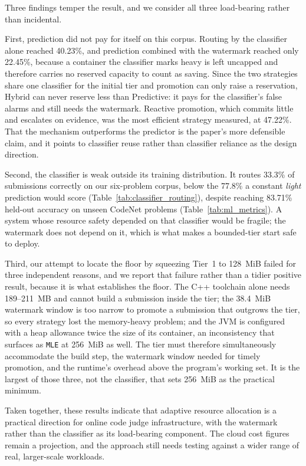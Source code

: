 \documentclass[conference]{IEEEtran}
\begin{document}
Three findings temper the result, and we consider all three load-bearing rather than incidental.

First, prediction did not pay for itself on this corpus. Routing by the classifier alone reached 40.23\%, and prediction combined with the watermark reached only 22.45\%, because a container the classifier marks heavy is left uncapped and therefore carries no reserved capacity to count as saving. Since the two strategies share one classifier for the initial tier and promotion can only raise a reservation, Hybrid can never reserve less than Predictive: it pays for the classifier's false alarms and still needs the watermark. Reactive promotion, which commits little and escalates on evidence, was the most efficient strategy measured, at 47.22\%. That the mechanism outperforms the predictor is the paper's more defensible claim, and it points to classifier reuse rather than classifier reliance as the design direction.

Second, the classifier is weak outside its training distribution. It routes 33.3\% of submissions correctly on our six-problem corpus, below the 77.8\% a constant \emph{light} prediction would score (Table~\ref{tab:classifier_routing}), despite reaching 83.71\% held-out accuracy on unseen CodeNet problems (Table~\ref{tab:ml_metrics}). A system whose resource safety depended on that classifier would be fragile; the watermark does not depend on it, which is what makes a bounded-tier start safe to deploy.

Third, our attempt to locate the floor by squeezing Tier~1 to 128~MiB failed for three independent reasons, and we report that failure rather than a tidier positive result, because it is what establishes the floor. The C++ toolchain alone needs 189--211~MB and cannot build a submission inside the tier; the 38.4~MiB watermark window is too narrow to promote a submission that outgrows the tier, so every strategy lost the memory-heavy problem; and the JVM is configured with a heap allowance twice the size of its container, an inconsistency that surfaces as \texttt{MLE} at 256~MiB as well. The tier must therefore simultaneously accommodate the build step, the watermark window needed for timely promotion, and the runtime's overhead above the program's working set. It is the largest of those three, not the classifier, that sets 256~MiB as the practical minimum.

Taken together, these results indicate that adaptive resource allocation is a practical direction for online code judge infrastructure, with the watermark rather than the classifier as its load-bearing component. The cloud cost figures remain a projection, and the approach still needs testing against a wider range of real, larger-scale workloads.
\end{document}
